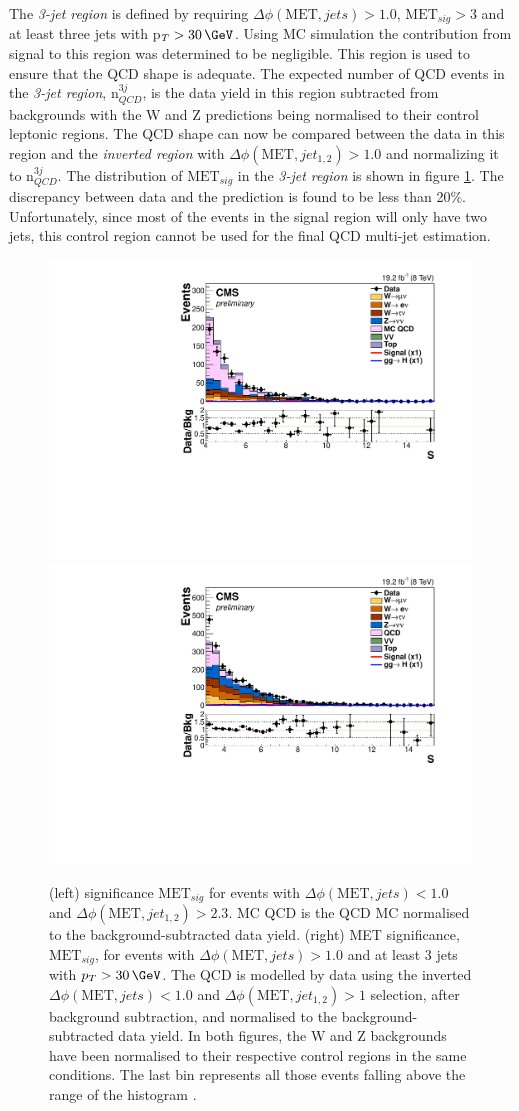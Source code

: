 The \textit{3-jet region} is defined by requiring $\Delta\phi(\text{MET},jets)>1.0$, $\text{MET}_{sig}>3$ and at least three jets with p$_{T}>30\,\GeV$. Using \gls{MC} simulation the contribution from signal to this region was determined to be negligible. This region is used to ensure that the \gls{QCD} shape is adequate. The expected number of \gls{QCD} events in the \textit{3-jet region}, n$_{QCD}^{3j}$, is the data yield in this region subtracted from backgrounds with the W and Z predictions being normalised to their control leptonic regions. The \gls{QCD} shape can now be compared between the data in this region and the \textit{inverted region} with $\Delta\phi(\text{MET},jet_{1,2})>1.0$ and normalizing it to n$_{QCD}^{3j}$. The distribution of $\text{MET}_{sig}$ in the \textit{3-jet region} is shown in figure \ref{FIGURE:ParkedDataAnalysis_QCDBackground_Plots}. The discrepancy between data and the prediction is found to be less than 20\%. Unfortunately, since most of the events in the signal region will only have two jets, this control region cannot be used for the final \gls{QCD} multi-jet estimation.

\begin{figure}[!htb]
\centering
\includegraphics[width=.45\textwidth]{Chapter07/Images/output_invqcd_qcd_metnomu_significance.pdf}
\includegraphics[width=.45\textwidth]{Chapter07/Images/output_invqcd_3j_nunu_metnomu_significance.pdf}
\caption{(left) \MET significance $\text{MET}_{sig}$ for events with $\Delta\phi(\text{MET},jets)<1.0$ and $\Delta\phi(\text{MET},jet_{1,2})>2.3$. MC QCD is the \gls{QCD} \gls{MC} normalised to the background-subtracted data yield. (right) \gls{MET} significance, $\text{MET}_{sig}$, for events with $\Delta\phi(\text{MET},jets)>1.0$ and at least 3 jets with $p_T>30\,\GeV$. The \gls{QCD} is modelled by data using the inverted $\Delta\phi(\text{MET},jets)<1.0$ and $\Delta\phi(\text{MET},jet_{1,2})>1$ selection, after background subtraction, and normalised to the background-subtracted data yield. In both figures, the W and Z backgrounds have been normalised to their respective control regions in the same conditions. The last bin represents all those events falling above the range of the histogram \cite{ARTICLE:CMSVBFHiggsInvisibleParkedAnalysisPAS}.}
\label{FIGURE:ParkedDataAnalysis_QCDBackground_Plots}
\end{figure}

